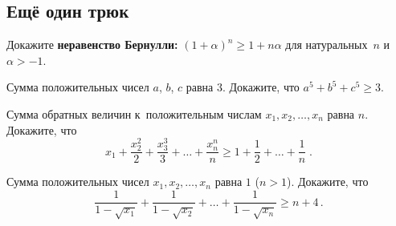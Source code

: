 \subsection*{Ещё один трюк}

\begin{problems}

\item
Докажите {\bf неравенство Бернулли:}
\(
    (1 + \alpha)^n \geq 1 + n \alpha
\)
для натуральных~$n$ и~$\alpha > -1$.

\item
Сумма положительных чисел $a$, $b$, $c$ равна $3$.
Докажите, что $a^5 + b^5 + c^5 \geq 3$.

\item
Сумма обратных величин к~положительным числам $x_1, x_2, \ldots, x_n$
равна $n$.
Докажите, что
\[
    x_1 + \frac{x_2^2}{2} + \frac{x_3^3}{3} +
    \ldots +
    \frac{x_n^n}{n}
\geq
    1 + \frac{1}{2} + \ldots + \frac{1}{n}
\; . \]

\item
Сумма положительных чисел $x_1, x_2, \ldots, x_n$ равна $1$ ($n > 1$).
Докажите, что
\[
    \frac{1}{1 - \sqrt{x_1}} + \frac{1}{1 - \sqrt{x_2}} +
    \ldots +
    \frac{1}{1 - \sqrt{x_n}}
\geq
    n + 4
\, . \]

\end{problems}

